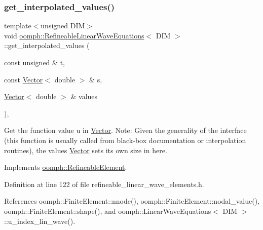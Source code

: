 \subsubsection{\texorpdfstring{get\+\_\+interpolated\+\_\+values()}{get\_interpolated\_values()}\hspace{0.1cm}{\footnotesize\ttfamily [2/2]}}
{\footnotesize\ttfamily template$<$unsigned D\+IM$>$ \\
void \hyperlink{classoomph_1_1RefineableLinearWaveEquations}{oomph\+::\+Refineable\+Linear\+Wave\+Equations}$<$ D\+IM $>$\+::get\+\_\+interpolated\+\_\+values (\begin{DoxyParamCaption}\item[{const unsigned \&}]{t,  }\item[{const \hyperlink{classoomph_1_1Vector}{Vector}$<$ double $>$ \&}]{s,  }\item[{\hyperlink{classoomph_1_1Vector}{Vector}$<$ double $>$ \&}]{values }\end{DoxyParamCaption})\hspace{0.3cm}{\ttfamily [inline]}, {\ttfamily [virtual]}}



Get the function value u in \hyperlink{classoomph_1_1Vector}{Vector}. Note\+: Given the generality of the interface (this function is usually called from black-\/box documentation or interpolation routines), the values \hyperlink{classoomph_1_1Vector}{Vector} sets its own size in here. 



Implements \hyperlink{classoomph_1_1RefineableElement_ada6f0efe831ffefb1d2829ce01d45bfc}{oomph\+::\+Refineable\+Element}.



Definition at line 122 of file refineable\+\_\+linear\+\_\+wave\+\_\+elements.\+h.



References oomph\+::\+Finite\+Element\+::nnode(), oomph\+::\+Finite\+Element\+::nodal\+\_\+value(), oomph\+::\+Finite\+Element\+::shape(), and oomph\+::\+Linear\+Wave\+Equations$<$ D\+I\+M $>$\+::u\+\_\+index\+\_\+lin\+\_\+wave().

\mbox{\label{classoomph_1_1RefineableLinearWaveEquations_af5b91e3507fc1ef71d9e1e1d9d0b4fe2}} 
